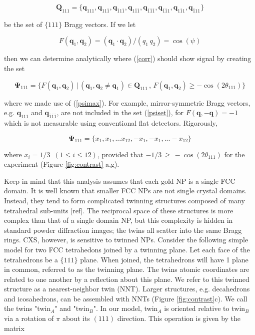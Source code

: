 \documentclass [11pt,fleqn]{article}
\def \be {\begin{equation}}
\def \ee {\end{equation}}
\begin{document}
\be
\bm Q_{111} = \{\bm q_{111}, \bm q_{11\bar 1},\bm q_{\bar 1 1\bar 1},\bm q_{1\bar 1 \bar 1},\bm q_{\bar 1\bar 1\bar 1},\bm q_{\bar 1\bar 1 1},\bm q_{1 \bar 11},\bm q_{\bar 1 1 1}\}
\ee

 be the set of $\{111\}$ Bragg vectors. If we let 

\be
F( \bm q_1, \bm q_2) =  (\bm q_1 \cdot \bm q_2)/(q_1 \, q_2 ) = \cos( \psi )
\ee

then we can determine analytically where (\ref{corr}) should show signal by creating the set

\be \label{psiset}
\bm \Psi_{111} = \{ F( \bm q_1, \bm q_2)\, \big | \, (\bm q_1, \bm q_2 \ne \bm q_1) \in \bm Q_{111}\, ,\,  F( \bm q_1, \bm q_2) \ge -\cos ( 2\theta_{111}  )  \}
\ee 

where we made use of (\ref{psimax}). For example, mirror-symmetric Bragg vectors, e.g. $\bm q_{111}$ and $\bm q_{\bar 1\bar 1\bar 1}$, are not included in the set  (\ref{psiset}), for $F(\bm q, -\bm q) = -1$ which is not measurable using conventional flat detectors. Rigorously,

\be
\bm \Psi_{111} = \{ x_1, x_1, ... x_{12}, -x_1, -x_1, ... -x_{12} \}
\ee 

where $x_i = 1/3\,\,\, (1 \le i \le 12 )$, provided that $ -1/3 \, \ge \, - \cos (2\theta_{111}) $ for the experiment (Figure \ref{fig:contrast} a,g). 

Keep in mind that this analysis assumes that each gold NP is a single FCC domain. It is well known that smaller FCC NPs are not single crystal domains. Instead, they tend to form complicated twinning structures composed of many tetrahedral sub-units [ref]. The reciprocal space of these structures is more complex than that of a single domain NP, but this complexity is hidden in standard powder diffraction images; the twins all scatter into the same Bragg rings. CXS, however, is sensitive to twinned NPs. Consider the following simple model for two FCC tetrahedons joined by a twinning plane. Let each face of the tetrahedrons be a $\{111\}$ plane. When joined, the tetrahedrons will have 1 plane in common, referred to as the twinning plane. The twins atomic coordinates are related to one another by a reflection about this plane. We refer to this twinned structure as a nearest-neighbor twin (NNT). Larger structures, e.g. decahedrons and icosahedrons, can be assembled with NNTs (Figure \ref{fig:contrast}c). We call the twins "twin$_A$" and "twin$_B$".  In our model, twin$_A$ is oriented relative to twin$_B$ via a rotation of $\pi$ about its $(111)$ direction. This operation is given by the matrix
\end{document}
